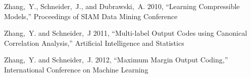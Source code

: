\documentclass[prd, nofootinbib, floatfix, 12pt,tightenlines]{revtex4}
\begin{document}
\begin{thebibliography}{99}
Zhang,~Y., Schneider,~J., and Dubrawski,~A. 2010,
``Learning Compressible Models,'' Proceedings of SIAM Data Mining Conference

Zhang,~Y. and Schneider,~J 2011, ``Multi-label Output Codes using Canonical Correlation
Analysis,'' Artificial Intelligence and Statistics

Zhang,~Y. and Schneider,~J. 2012, ``Maximum Margin Output Coding,''
International Conference on Machine Learning

\end{thebibliography} 
\label{lastpage}
\end{document}
